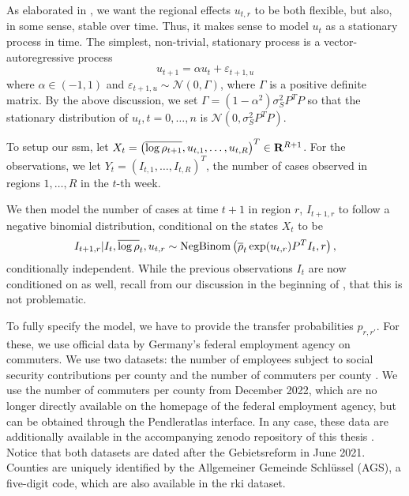 As elaborated in , we want the regional effects $u_{t,r}$ to be both flexible, but also, in some sense, stable over time. Thus, it makes sense to model $u_{t}$ as a stationary process in time. The simplest, non-trivial, stationary process is a vector-autoregressive process 
$$
    u_{t + 1} = \alpha u_{t} + \varepsilon_{t + 1, u}
$$
where $\alpha \in (-1, 1)$ and $\varepsilon_{t + 1,u} \sim \mathcal N(0, \Gamma)$, where $\Gamma$ is a positive definite matrix. By the above discussion, we set $\Gamma = (1-\alpha^{2}) \sigma^{2}_{S}P^{T}P$ so that the stationary distribution of $u_{t}, t = 0, \dots, n$  is $\mathcal N(0, \sigma^{2}_SP^{T}P)$. 

To setup our \acrshort{ssm}, let $X_{t} = \left( \overline{\log \rho_{t + 1}}, u_{t, 1}, \dots, u_{t, R} \right)^{T} \in \mathbf R^{R + 1}$. For the observations, we let $Y_{t} = \left( I_{t, 1}, \dots, I_{t, R} \right)^{T}$, the number of cases observed in regions $1, \dots, R$ in the $t$-th week. 

We then model the number of cases at time $t + 1$ in region $r$, $I_{t+1, r}$ to follow a negative binomial distribution, conditional on the states $X_{t}$ to be
$$
    I_{t+1,r} | I_{t}, \overline{\log\rho}_{t}, u_{t,r} \sim \operatorname{NegBinom} \left( \overline{\rho}_{t}\exp(u_{t,r})P^{T}I_t, r\right),
$$
conditionally independent. While the previous observations $I_{t}$ are now conditioned on as well, recall from our discussion in the beginning of , that this is not problematic.

To fully specify the model, we have to provide the transfer probabilities $p_{r,r'}$. For these, we use official data by Germany's federal employment agency on commuters. We use two datasets: the number of employees subject to social security contributions per county \citep{BundesagenturfuerArbeitStatistik2021Sozialversicherungspflichtig} and the number of commuters per county  \citep{BundesagenturfuerArbeitStatistik2024Pendleratlas}. We use the number of commuters per county from December 2022, which are no longer directly available on the homepage of the federal employment agency, but can be obtained through the Pendleratlas interface. In any case, these data are additionally available in the accompanying zenodo repository of this thesis . Notice that both datasets are dated after the Gebietsreform in June 2021. Counties are uniquely identified by the Allgemeiner Gemeinde Schlüssel (AGS), a five-digit code, which are also available in the \acrshort{rki} dataset. 

